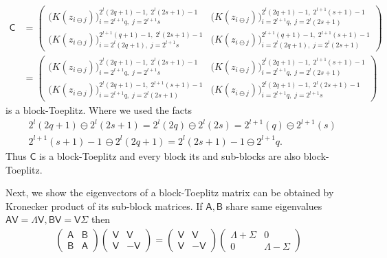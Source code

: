 \documentclass{iitthesis}          %
\newcommand{\mSigma}{\mathsf{\Sigma}}
\newcommand{\mB}{\mathsf{B}}
\newcommand{\mA}{\mathsf{A}}
\newcommand{\mC}{\mathsf{C}}
\newcommand{\mLambda}{\mathsf{\Lambda}}
\newcommand{\mV}{\mathsf{V}}
\newcommand{\ia}{2^{l+1}q}
\newcommand{\ib}{2^{l}(2q+1)-1}
\newcommand{\ic}{2^{l}(2q+1)}
\newcommand{\id}{2^{l+1}(q+1)-1}
\newcommand{\ja}{2^{l+1}s}
\newcommand{\jb}{2^{l}(2s+1)-1}
\newcommand{\jc}{2^{l}(2s+1)}
\newcommand{\jd}{2^{l+1}(s+1)-1}
\begin{document}
\begin{itemize}
\begin{align*}
\mC &=
\begin{pmatrix}
\bigl( K(z_{i \ominus j})\bigr)_{i=\ia, \; j=\ja }^{\ib, \; \jb} & \bigl( K(z_{i \ominus j})\bigr)_{i=\ia, \; j=\jc }^{\ib, \; \jd} \\
\bigl( K(z_{i \ominus j})\bigr)_{i=\ic, \; j=\ja }^{\id, \; \jb} & \bigl( K(z_{i \ominus j})\bigr)_{i=\ic, \; j=\jc }^{\id, \; \jd}
\end{pmatrix} \\
& =
\begin{pmatrix}
\bigl( K(z_{i \ominus j})\bigr)_{i=\ia, \; j=\ja }^{\ib, \; \jb} & \bigl( K(z_{i \ominus j})\bigr)_{i=\ia, \; j=\jc }^{\ib, \; \jd} \\
\bigl( K(z_{i \ominus j})\bigr)_{i=\ia, \; j=\jc }^{\ib, \; \jd} & \bigl( K(z_{i \ominus j})\bigr)_{i=\ia, \; j=\ja }^{\ib, \; \jb}
\end{pmatrix}
\end{align*}
is a block-Toeplitz. Where we used the facts
\begin{align*}
& 2^{l}(2q+1) \ominus 2^{l}(2s+1) = 2^{l}(2q) \ominus 2^{l}(2s) = 2^{l+1}(q) \ominus 2^{l+1}(s) \\
&2^{l+1}(s+1)-1 \, \ominus 2^{l}(2q + 1) %
 = 2^{l}(2s+1)-1 \ominus 2^{l+1}q.
\end{align*}
Thus $\mC$ is a block-Toeplitz and every block its and sub-blocks are also block-Toeplitz.

\end{itemize}




Next, we show the eigenvectors of a block-Toeplitz matrix can be obtained by Kronecker product of its sub-block matrices. If $\mA, \mB$ share same eigenvalues $\mA \mV = \mLambda \mV, \mB \mV = \mV \mSigma$ then
	\begin{align*}
	\begin{pmatrix}
	\mA & \mB \\ \mB & \mA
	\end{pmatrix}
	\begin{pmatrix}
	\mV & \mV \\ \mV & -\mV
	\end{pmatrix}
	 = 
	\begin{pmatrix}
	\mV & \mV \\ \mV & -\mV
	\end{pmatrix}
	\begin{pmatrix}
	\mLambda + \mSigma & 0 \\ 0 & \mLambda - \mSigma 
	\end{pmatrix}
	\end{align*}
\end{document}
